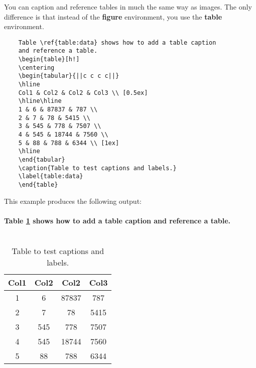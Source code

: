 You can caption and reference tables in much the same way as images. The only difference is that instead of the \textbf{figure} environment, you use the \textbf{table} environment.

\begin{tcolorbox}
\begin{verbatim}
    Table \ref{table:data} shows how to add a table caption 
    and reference a table.
    \begin{table}[h!]
    \centering
    \begin{tabular}{||c c c c||} 
    \hline
    Col1 & Col2 & Col2 & Col3 \\ [0.5ex] 
    \hline\hline
    1 & 6 & 87837 & 787 \\ 
    2 & 7 & 78 & 5415 \\
    3 & 545 & 778 & 7507 \\
    4 & 545 & 18744 & 7560 \\
    5 & 88 & 788 & 6344 \\ [1ex] 
    \hline
    \end{tabular}
    \caption{Table to test captions and labels.}
    \label{table:data}
    \end{table}
\end{verbatim}
\end{tcolorbox}

This example produces the following output:

\begin{table}[h!]
\begin{mdframed}
    \paragraph{\-\hspace{20pt}Table \ref{table:data} shows how to add a table caption and reference a table.\\\mbox{}\\}
    
    \centering
    \begin{tabular}{||c c c c||} 
    \hline
    Col1 & Col2 & Col2 & Col3 \\ [0.5ex] 
    \hline\hline
    1 & 6 & 87837 & 787 \\ 
    2 & 7 & 78 & 5415 \\
    3 & 545 & 778 & 7507 \\
    4 & 545 & 18744 & 7560 \\
    5 & 88 & 788 & 6344 \\ [1ex] 
    \hline
    \end{tabular}
    \caption{Table to test captions and labels.}
    \label{table:data}
\end{mdframed}
\end{table}